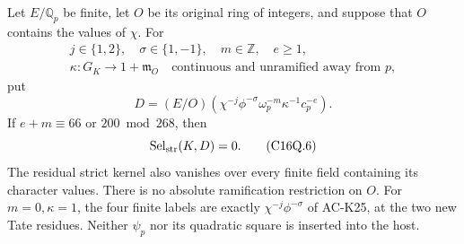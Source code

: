 \begin{theorem}
\label{AC-G147}
Let $E/\mathbb Q_p$ be finite, let $O$ be its original ring of integers,
and suppose that $O$ contains the values of $\chi$.
For
\[
 \begin{gathered}
 j\in\{1,2\},\quad \sigma\in\{1,-1\},\quad m\in\mathbb Z,\quad e\geq1,\\
 \kappa:G_K\longrightarrow1+\mathfrak m_O
       \quad\text{continuous and unramified away from }p,
 \end{gathered}
 \tag{C16Q.4}
\]
put
\[
       D=(E/O)(\chi^{-j}\phi^{-\sigma}
                    \omega_p^{-m}\kappa^{-1}c_p^{-e}).
 \tag{C16Q.5}
\]
If $e+m\equiv66$ or $200\bmod268$, then
\[
                       \operatorname{Sel}_{\rm str}(K,D)=0.
 \tag{C16Q.6}
\]
The residual strict kernel also vanishes over every finite field
containing its character values.
There is no absolute ramification restriction on $O$.
For $m=0,\kappa=1$, the four finite labels are exactly
$\chi^{-j}\phi^{-\sigma}$ of AC-K25, at the two new Tate residues.
Neither $\psi_p$ nor its quadratic square is inserted into the host.
\end{theorem}

